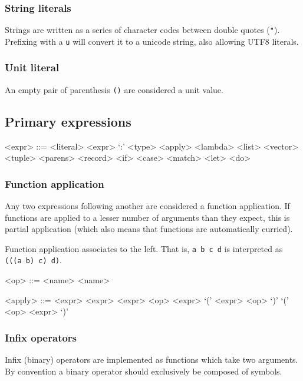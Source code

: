 \subsubsection{String literals}
Strings are written as a series of character codes between double quotes (\texttt{"}). Prefixing with a \texttt{u} will convert it to a unicode string, also allowing UTF8 literals.

\subsubsection{Unit literal}
An empty pair of parenthesis \texttt{()} are considered a unit value.

\subsection{Primary expressions}
\begin{grammar}
<expr> ::= <literal>
      \alt <expr> `:' <type>
      \alt <apply>
      \alt <lambda>
      \alt <list>
      \alt <vector>
      \alt <tuple>
      \alt <parens>
      \alt <record>
      \alt <if>
      \alt <case>
      \alt <match>
      \alt <let>
      \alt <do>
\end{grammar}

\subsubsection{Function application}
Any two expressions following another are considered a function application. If functions are applied to a lesser number of arguments than they expect, this is partial application (which also means that functions are automatically curried).

Function application associates to the left. That is, \texttt{a b c d} is interpreted as \texttt{(((a b) c) d)}.

\begin{grammar}
<op> ::= <name>
    \alt \lit{\`{}} <name> \lit{\`{}}

<apply> ::= <expr> <expr>
       \alt <expr> <op> <expr>
       \alt `(' <expr> <op> `)'
       \alt `(' <op> <expr> `)'
\end{grammar}

\subsubsection{Infix operators}
Infix (binary) operators are implemented as functions which take two arguments. By convention a binary operator should exclusively be composed of symbols.

